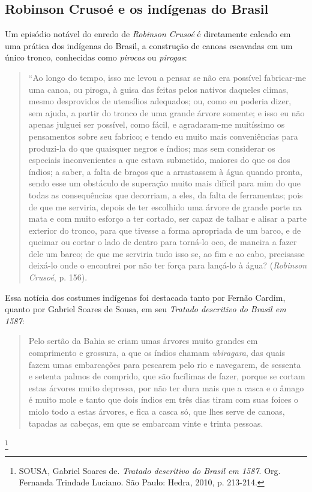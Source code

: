 \documentclass[12pt]{extarticle}
\begin{document}
\subsection{Robinson Crusoé e os indígenas do Brasil}

Um episódio notável do enredo de \emph{Robinson Crusoé} é diretamente
calcado em uma prática dos indígenas do Brasil, a construção de canoas
escavadas em um único tronco, conhecidas como \emph{pirocas} ou
\emph{pirogas}:

\begin{quote}
``Ao longo do tempo, isso me levou a pensar se não era possível
fabricar-me uma canoa, ou piroga, à guisa das feitas pelos nativos
daqueles climas, mesmo desprovidos de utensílios adequados; ou, como eu
poderia dizer, sem ajuda, a partir do tronco de uma grande árvore
somente; e isso eu não apenas julguei ser possível, como fácil, e
agradaram-me muitíssimo os pensamentos sobre seu fabrico; e tendo eu
muito mais conveniências para produzi-la do que quaisquer negros e
índios; mas sem considerar os especiais inconvenientes a que estava
submetido, maiores do que os dos índios; a saber, a falta de braços que
a arrastassem à água quando pronta, sendo esse um obstáculo de superação
muito mais difícil para mim do que todas as consequências que decorriam,
a eles, da falta de ferramentas; pois de que me serviria, depois de ter
escolhido uma árvore de grande porte na mata e com muito esforço a ter
cortado, ser capaz de talhar e alisar a parte exterior do tronco, para
que tivesse a forma apropriada de um barco, e de queimar ou cortar o
lado de dentro para torná-lo oco, de maneira a fazer dele um barco; de
que me serviria tudo isso se, ao fim e ao cabo, precisasse deixá-lo onde
o encontrei por não ter força para lançá-lo à água? (\emph{Robinson
Crusoé}, p. 156).
\end{quote}


Essa notícia dos costumes indígenas foi destacada tanto por Fernão
Cardim, quanto por Gabriel Soares de Sousa, em seu \emph{Tratado
descritivo do Brasil em 1587}:

\begin{quote}
Pelo sertão da Bahia se criam umas árvores muito grandes em comprimento
e grossura, a que os índios chamam \emph{ubiragara}, das quais fazem umas
embarcações para pescarem pelo rio e navegarem, de sessenta e setenta
palmos de comprido, que são facílimas de fazer, porque se cortam estas
árvores muito depressa, por não ter dura mais que a casca e o âmago é
muito mole e tanto que dois índios em três dias tiram com suas foices o
miolo todo a estas árvores, e fica a casca só, que lhes serve de canoas,
tapadas as cabeças, em que se embarcam vinte e trinta
pessoas.\end{quote}\footnote{SOUSA, Gabriel Soares de. \emph{Tratado descritivo
  do Brasil em 1587}. Org. Fernanda Trindade Luciano. São Paulo: Hedra,
  2010, p. 213-214.}
\end{document}
